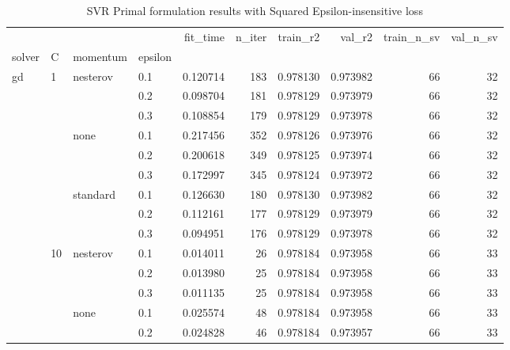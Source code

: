 \begin{table}[h!]
\centering
\caption{SVR Primal formulation results with Squared Epsilon-insensitive loss}
\label{primal_svr_squared_eps_cv_results}
\begin{tabular}{llllrrrrrr}
\toprule
          &     &   &     &  fit\_time &  n\_iter &     train\_r2 &       val\_r2 &  train\_n\_sv &  val\_n\_sv \\
solver & C & momentum & epsilon &           &         &              &              &             &           \\
\midrule
gd & 1   & nesterov & 0.1 &  0.120714 &     183 &     0.978130 &     0.973982 &          66 &        32 \\
          &     &   & 0.2 &  0.098704 &     181 &     0.978129 &     0.973979 &          66 &        32 \\
          &     &   & 0.3 &  0.108854 &     179 &     0.978129 &     0.973978 &          66 &        32 \\
          &     & none & 0.1 &  0.217456 &     352 &     0.978126 &     0.973976 &          66 &        32 \\
          &     &   & 0.2 &  0.200618 &     349 &     0.978125 &     0.973974 &          66 &        32 \\
          &     &   & 0.3 &  0.172997 &     345 &     0.978124 &     0.973972 &          66 &        32 \\
          &     & standard & 0.1 &  0.126630 &     180 &     0.978130 &     0.973982 &          66 &        32 \\
          &     &   & 0.2 &  0.112161 &     177 &     0.978129 &     0.973979 &          66 &        32 \\
          &     &   & 0.3 &  0.094951 &     176 &     0.978129 &     0.973978 &          66 &        32 \\
          & 10  & nesterov & 0.1 &  0.014011 &      26 &     0.978184 &     0.973958 &          66 &        33 \\
          &     &   & 0.2 &  0.013980 &      25 &     0.978184 &     0.973958 &          66 &        33 \\
          &     &   & 0.3 &  0.011135 &      25 &     0.978184 &     0.973958 &          66 &        33 \\
          &     & none & 0.1 &  0.025574 &      48 &     0.978184 &     0.973958 &          66 &        33 \\
          &     &   & 0.2 &  0.024828 &      46 &     0.978184 &     0.973957 &          66 &        33 \\

\end{tabular}
\end{table}
